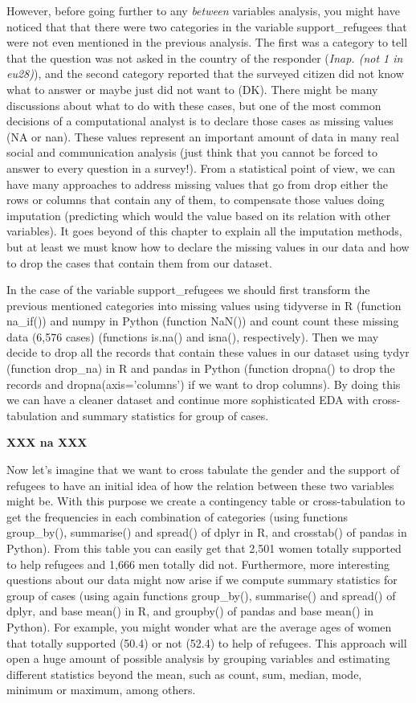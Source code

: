 However, before going further to any \textit{between} variables analysis, you might have noticed that that there were two categories in the variable support\_refugees that were not even mentioned in the previous analysis. The first was a category to tell that the question was not asked in the country of the responder (\textit{Inap. (not 1 in eu28)}), and the second category reported that the surveyed citizen did not know what to answer or maybe just did not want to (DK). There might be many discussions about what to do with these cases, but one of the most common decisions of a computational analyst is to declare those cases as missing values (NA or nan).  These values represent an important amount of data in many real social and communication analysis (just think that you cannot be forced to answer to every question in a survey!). From a statistical point of view, we can have many approaches to address missing values that go from drop either the rows or columns that contain any of them, to compensate those values doing imputation (predicting which would the value based on its relation with other variables). It goes beyond of this chapter to explain all the imputation methods, but at least we must know how to declare the missing values in our data and how to drop the cases that contain them from our dataset.

In the case of the variable support\_refugees we should first transform the previous mentioned categories into missing values using tidyverse in R (function na\_if()) and numpy in Python (function NaN()) and count count these missing data (6,576 cases) (functions is.na() and isna(), respectively).   Then we may decide to drop all the records that contain these values in our dataset using tydyr (function drop\_na) in R and pandas in Python (function dropna() to drop the records and dropna(axis='columns') if we want to drop columns). By doing this we can have a cleaner dataset and continue more sophisticated EDA with cross-tabulation and summary statistics for group of cases.	

\textbf{XXX  na  XXX}


Now let's imagine that we want to cross tabulate the gender and the support of refugees to have an initial idea of how the relation between these two variables might be. With this purpose we create a contingency table or cross-tabulation to get the frequencies in each combination of categories (using functions group\_by(), summarise() and spread() of dplyr in R, and crosstab() of pandas in Python). From this table you can easily get that 2,501 women totally supported to help refugees and 1,666 men totally did not.  Furthermore, more interesting questions about our data might now arise if we compute summary statistics for group of cases (using again functions group\_by(), summarise() and spread() of dplyr, and base mean() in R, and groupby() of pandas and base mean() in Python). For example, you might wonder what are the average ages of women that totally supported (50.4) or not (52.4) to help of refugees.  This approach will open a huge amount of possible analysis by grouping variables and estimating different statistics beyond the mean, such as count, sum, median, mode, minimum or maximum, among others.
